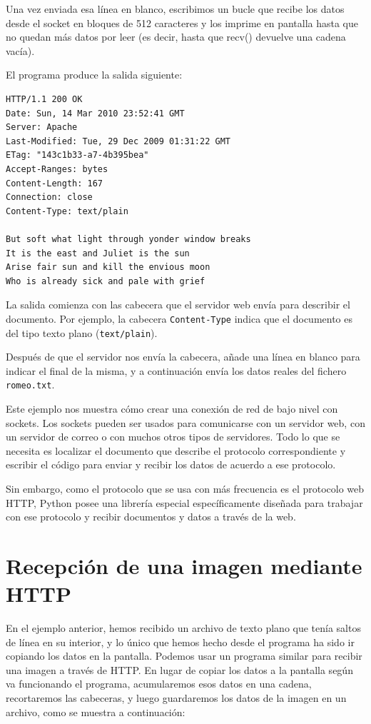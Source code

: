 Una vez enviada esa línea en blanco, escribimos un bucle que recibe los datos
desde el socket en bloques de 512 caracteres y los imprime en pantalla
hasta que no quedan más datos por leer (es decir, hasta que recv() devuelve
una cadena vacía).

El programa produce la salida siguiente:

\beforeverb
\begin{verbatim}
HTTP/1.1 200 OK
Date: Sun, 14 Mar 2010 23:52:41 GMT
Server: Apache
Last-Modified: Tue, 29 Dec 2009 01:31:22 GMT
ETag: "143c1b33-a7-4b395bea"
Accept-Ranges: bytes
Content-Length: 167
Connection: close
Content-Type: text/plain

But soft what light through yonder window breaks
It is the east and Juliet is the sun
Arise fair sun and kill the envious moon
Who is already sick and pale with grief
\end{verbatim}
\afterverb
%
La salida comienza con las cabecera que el servidor web envía
para describir el documento.
Por ejemplo, la cabecera {\tt Content-Type} indica que
el documento es del tipo texto plano ({\tt text/plain}).

Después de que el servidor nos envía la cabecera, añade una línea en blanco
para indicar el final de la misma, y a continuación envía los datos
reales del fichero {\tt romeo.txt}.

Este ejemplo nos muestra cómo crear una conexión de red de bajo nivel
con sockets. Los sockets pueden ser usados para comunicarse con un servidor
web, con un servidor de correo o con muchos otros tipos de servidores.
Todo lo que se necesita es localizar el documento que describe
el protocolo correspondiente y escribir el código para enviar y recibir los datos
de acuerdo a ese protocolo.

Sin embargo, como el protocolo que se usa con más frecuencia es
el protocolo web HTTP, Python posee una librería
especial específicamente diseñada para trabajar con ese protocolo
y recibir documentos y datos a través de la web.

\section{Recepción de una imagen mediante HTTP}

En el ejemplo anterior, hemos recibido un archivo de texto plano
que tenía saltos de línea en su interior, y lo único que hemos hecho
desde el programa ha sido ir copiando los datos en la pantalla. Podemos usar un programa
similar para recibir una imagen a través de HTTP. En lugar
de copiar los datos a la pantalla según va funcionando el programa,
acumularemos esos datos en una cadena, recortaremos las cabeceras,
y luego guardaremos los datos de la imagen en un archivo, como se muestra a continuación:


